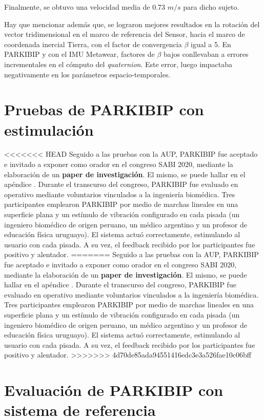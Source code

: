 Finalmente, se obtuvo una velocidad media de 0.73 $m/s$ para dicho sujeto.

Hay que mencionar además que, se lograron mejores resultados en la rotación del vector tridimensional en el marco de referencia del Sensor, hacia el marco de coordenada inercial Tierra, con el factor de convergencia $\beta$ igual a 5. En PARKIBIP y con el IMU Metawear, factores de $\beta$ bajos conllevaban a errores incrementales en el cómputo del \textit{quaternion}. Este error, luego impactaba negativamente en los parámetros espacio-temporales.

\section{Pruebas de PARKIBIP con estimulación}

<<<<<<< HEAD
Seguido a las pruebas con la AUP, PARKIBIP fue aceptado e invitado a exponer como orador en el congreso SABI 2020, mediante la elaboración de un \textbf{paper de investigación}. El mismo, se puede hallar en el apéndice . Durante el transcurso del congreso, PARKIBIP fue evaluado en operativo mediante voluntarios vinculados a la ingeniería biomédica. Tres participantes emplearon PARKIBIP por medio de marchas lineales en una superficie plana y un estímulo de vibración configurado en cada pisada (un ingeniero biomédico de origen peruano, un médico argentino y un profesor de educación física uruguayo). El sistema actuó correctamente, estimulando al usuario con cada pisada.  A su vez, el feedback recibido por los participantes fue positivo y alentador.
=======
Seguido a las pruebas con la AUP, PARKIBIP fue aceptado e invitado a exponer como orador en el congreso SABI 2020, mediante la elaboración de un \textbf{paper de investigación}. El mismo, se puede hallar en el apéndice . Durante el transcurso del congreso, PARKIBIP fue evaluado en operativo mediante voluntarios vinculados a la ingeniería biomédica. Tres participantes emplearon PARKIBIP por medio de marchas lineales en una superficie plana y un estímulo de vibración configurado en cada pisada (un ingeniero biomédico de origen peruano, un médico argentino y un profesor de educación física uruguayo). El sistema actuó correctamente, estimulando al usuario con cada pisada. A su vez, el feedback recibido por los participantes fue positivo y alentador.
>>>>>>> 4d70de85ada94551416edc3e3a526fae10c06bff

\section{Evaluación de PARKIBIP con sistema de referencia}

